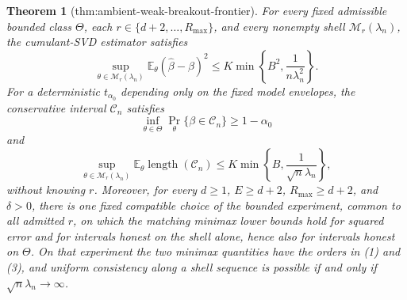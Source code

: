 \documentclass{article}
\newtheorem{theorem}{Theorem}
\begin{document}
\begin{theorem}[thm:ambient-weak-breakout-frontier]\label{thm:ambient-weak-breakout-frontier}
For every fixed admissible bounded class \(\Theta\), each \(r\in\{d+2,\ldots,R_{\max}\}\), and every nonempty shell \(\mathcal M_r(\lambda_n)\), the cumulant-SVD estimator satisfies
\[
 \sup_{\theta\in\mathcal M_r(\lambda_n)}
 \mathbb E_\theta(\widehat\beta-\beta)^2
 \leq K\min\left\{B^2,\frac1{n\lambda_n^2}\right\}.                    \tag{1}
\]
For a deterministic \(t_{\alpha_0}\) depending only on the fixed model envelopes, the conservative interval \(\mathcal C_n\) satisfies
\[
 \inf_{\theta\in\Theta}\Pr_\theta\{\beta\in\mathcal C_n\}
 \geq1-\alpha_0                                                         \tag{2}
\]
and
\[
 \sup_{\theta\in\mathcal M_r(\lambda_n)}
 \mathbb E_\theta\operatorname{length}(\mathcal C_n)
 \leq K\min\left\{B,\frac1{\sqrt n\lambda_n}\right\},                  \tag{3}
\]
without knowing \(r\).  Moreover, for every \(d\geq1\), \(E\geq d+2\), \(R_{\max}\geq d+2\), and \(\delta>0\), there is one fixed compatible choice of the bounded experiment, common to all admitted \(r\), on which the matching minimax lower bounds hold for squared error and for intervals honest on the shell alone, hence also for intervals honest on \(\Theta\).  On that experiment the two minimax quantities have the orders in (1) and (3), and uniform consistency along a shell sequence is possible if and only if \(\sqrt n\lambda_n\to\infty\).
\end{theorem}
\end{document}
